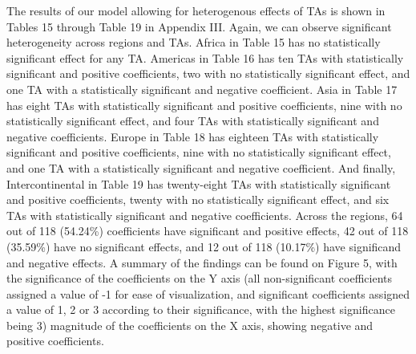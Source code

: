 The results of our model allowing for heterogenous effects of TAs is
shown in Tables 15 through Table 19 in Appendix III. Again, we can
observe significant heterogeneity across regions and TAs. Africa in
Table 15 has no statistically significant effect for any TA. Americas in
Table 16 has ten TAs with statistically significant and positive
coefficients, two with no statistically significant effect, and one TA
with a statistically significant and negative coefficient. Asia in Table
17 has eight TAs with statistically significant and positive
coefficients, nine with no statistically significant effect, and four
TAs with statistically significant and negative coefficients. Europe in
Table 18 has eighteen TAs with statistically significant and positive
coefficients, nine with no statistically significant effect, and one TA
with a statistically significant and negative coefficient. And finally,
Intercontinental in Table 19 has twenty-eight TAs with statistically
significant and positive coefficients, twenty with no statistically
significant effect, and six TAs with statistically significant and
negative coefficients. Across the regions, 64 out of 118 (54.24\%)
coefficients have significant and positive effects, 42 out of 118
(35.59\%) have no significant effects, and 12 out of 118 (10.17\%) have
significand and negative effects. A summary of the findings can be found
on Figure 5, with the significance of the coefficients on the Y axis (all
non-significant coefficients assigned a value of -1 for ease of
visualization, and significant coefficients assigned a value of 1, 2 or
3 according to their significance, with the highest significance being
3) magnitude of the coefficients on the X axis, showing negative and
positive coefficients.
